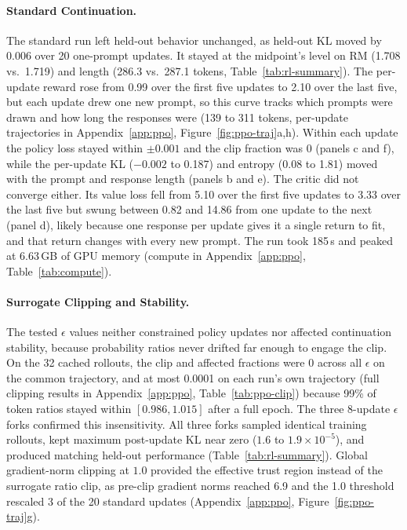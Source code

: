 \documentclass{article}
\begin{document}
\paragraph{Standard Continuation.} The standard run left held-out behavior unchanged, as held-out KL moved by 0.006 over 20 one-prompt updates. It stayed at the midpoint's level on RM (1.708 vs.\ 1.719) and length (286.3 vs.\ 287.1 tokens, Table~\ref{tab:rl-summary}). The per-update reward rose from 0.99 over the first five updates to 2.10 over the last five, but each update drew one new prompt, so this curve tracks which prompts were drawn and how long the responses were (139 to 311 tokens, per-update trajectories in Appendix~\ref{app:ppo}, Figure~\ref{fig:ppo-traj}a,h). Within each update the policy loss stayed within $\pm 0.001$ and the clip fraction was 0 (panels c and f), while the per-update KL ($-0.002$ to 0.187) and entropy (0.08 to 1.81) moved with the prompt and response length (panels b and e). The critic did not converge either. Its value loss fell from 5.10 over the first five updates to 3.33 over the last five but swung between 0.82 and 14.86 from one update to the next (panel d), likely because one response per update gives it a single return to fit, and that return changes with every new prompt. The run took 185\,s and peaked at 6.63\,GB of GPU memory (compute in Appendix~\ref{app:ppo}, Table~\ref{tab:compute}).

\paragraph{Surrogate Clipping and Stability.} The tested $\epsilon$ values neither constrained policy updates nor affected continuation stability, because probability ratios never drifted far enough to engage the clip. On the 32 cached rollouts, the clip and affected fractions were 0 across all $\epsilon$ on the common trajectory, and at most 0.0001 on each run's own trajectory (full clipping results in Appendix~\ref{app:ppo}, Table~\ref{tab:ppo-clip}) because 99\% of token ratios stayed within $[0.986, 1.015]$ after a full epoch. The three 8-update $\epsilon$ forks confirmed this insensitivity. All three forks sampled identical training rollouts, kept maximum post-update KL near zero ($1.6$ to $1.9 \times 10^{-5}$), and produced matching held-out performance (Table~\ref{tab:rl-summary}). Global gradient-norm clipping at $1.0$ provided the effective trust region instead of the surrogate ratio clip, as pre-clip gradient norms reached 6.9 and the 1.0 threshold rescaled 3 of the 20 standard updates (Appendix~\ref{app:ppo}, Figure~\ref{fig:ppo-traj}g).
\end{document}
